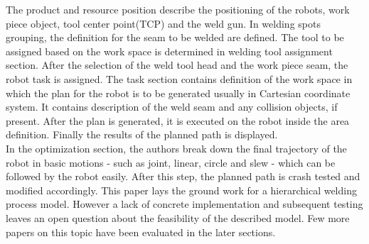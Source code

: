 The product and resource position describe the positioning of the robots, work piece object, tool center point(TCP) and the weld gun. In welding spots grouping, the definition for the seam to be welded are defined. The tool to be assigned based on the work space is determined in welding tool assignment section. After the selection of the weld tool head and the work piece seam, the robot task is assigned. The task section contains definition of the work space in which the plan for the robot is to be generated usually in Cartesian coordinate system. It contains description of the weld seam and any collision objects, if present. After the plan is generated, it is executed on the robot inside the area definition. Finally the results of the planned path is displayed. \\ In the optimization section, the authors break down the final trajectory of the robot in basic motions -  such as joint, linear, circle and slew - which can be followed by the robot easily. After this step, the planned path is crash tested and modified accordingly. This paper lays the ground work for a hierarchical welding process model. However a lack of concrete implementation and subsequent testing leaves an open question about the feasibility of the described model. Few more papers on this topic have been evaluated in the later sections.

